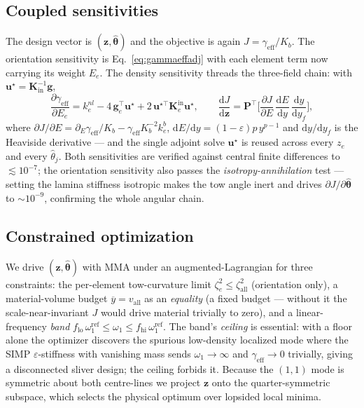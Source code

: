 \documentclass[11pt]{article}
\newcommand{\dd}{\mathrm{d}}
\newcommand{\zall}{\zeta_{\mathrm{all}}}
\begin{document}
\subsection{Coupled sensitivities}
The design vector is $(\bm z,\hat{\bm\theta})$ and the objective is again
$J=\gamma_{\mathrm{eff}}/K_b$. The orientation sensitivity is Eq.~\eqref{eq:gammaeffadj}
with each element term now carrying its weight $E_e$. The density sensitivity
threads the three-field chain: with $\bm u^\star=\bm K_{\mathrm{in}}^{-1}\bm g$,
\begin{equation}
\frac{\partial\gamma_{\mathrm{eff}}}{\partial E_e}
=k^{nl}_e-4\,\bm g_e^{\!\top}\bm u^\star+2\,\bm u^{\star\top}\bm K^{\mathrm{in}}_e\bm u^\star,
\qquad
\frac{\dd J}{\dd\bm z}=\bm P^{\!\top}\!\Big[\frac{\partial J}{\partial E}\,
\frac{\dd E}{\dd y}\,\frac{\dd y}{\dd y_f}\Big],
\label{eq:dzchain}
\end{equation}
where $\partial J/\partial E=\partial_E\gamma_{\mathrm{eff}}/K_b-\gamma_{\mathrm{eff}}K_b^{-2}k^b_e$,
$\dd E/\dd y=(1-\varepsilon)p\,y^{p-1}$ and $\dd y/\dd y_f$ is the Heaviside
derivative --- and the single adjoint solve $\bm u^\star$ is reused across every
$z_e$ and every $\hat\theta_j$. Both sensitivities are verified against central
finite differences to $\lesssim\!10^{-7}$; the orientation sensitivity also passes
the \emph{isotropy-annihilation} test --- setting the lamina stiffness isotropic
makes the tow angle inert and drives $\partial J/\partial\hat{\bm\theta}$ to
$\sim\!10^{-9}$, confirming the whole angular chain.

\subsection{Constrained optimization}
We drive $(\bm z,\hat{\bm\theta})$ with MMA under an augmented-Lagrangian for three
constraints: the per-element tow-curvature limit $\zeta_e^2\le\zall^2$ (orientation
only), a material-volume budget $\overline{y}=v_{\mathrm{all}}$ as an
\emph{equality} (a fixed budget --- without it the scale-near-invariant $J$ would
drive material trivially to zero), and a linear-frequency \emph{band}
$f_{\mathrm{lo}}\,\omega_1^{\mathrm{ref}}\le\omega_1\le f_{\mathrm{hi}}\,\omega_1^{\mathrm{ref}}$.
The band's \emph{ceiling} is essential: with a floor alone the optimizer discovers
the spurious low-density localized mode where the SIMP $\varepsilon$-stiffness with
vanishing mass sends $\omega_1\!\to\!\infty$ and $\gamma_{\mathrm{eff}}\!\to\!0$
trivially, giving a disconnected sliver design; the ceiling forbids it. Because the
$(1,1)$ mode is symmetric about both centre-lines we project $\bm z$ onto the
quarter-symmetric subspace, which selects the physical optimum over lopsided local
minima.
\end{document}
